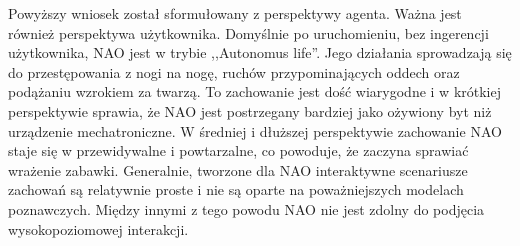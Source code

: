 Powyższy wniosek został sformułowany z perspektywy agenta. Ważna jest również perspektywa użytkownika.
Domyślnie po uruchomieniu, bez ingerencji użytkownika, NAO jest w trybie ,,Autonomus life''.
Jego działania sprowadzają się do przestępowania z nogi na nogę, ruchów przypominających oddech oraz podążaniu wzrokiem za twarzą. To zachowanie jest dość wiarygodne i w krótkiej perspektywie sprawia, że NAO jest postrzegany bardziej jako ożywiony byt niż urządzenie mechatroniczne. W średniej i dłuższej perspektywie zachowanie NAO staje się w przewidywalne i powtarzalne, co powoduje, że zaczyna sprawiać wrażenie zabawki. Generalnie, tworzone dla NAO interaktywne scenariusze zachowań są relatywnie proste i nie są oparte na poważniejszych modelach poznawczych. Między innymi z tego powodu NAO nie jest zdolny do podjęcia wysokopoziomowej interakcji.

